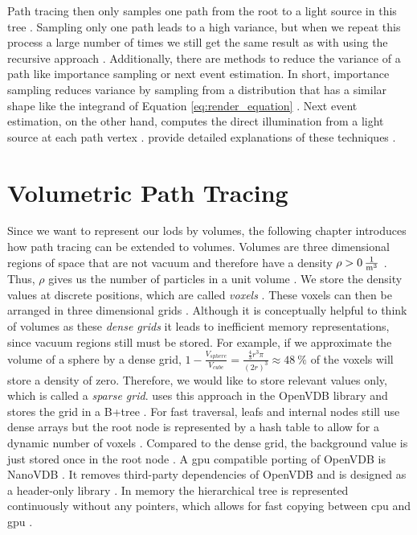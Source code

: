 Path tracing then only samples one path from the root to a light source in this tree \cite{rendering_equation}.
Sampling only one path leads to a high variance, but when we repeat this process a large number of times we still get the same result as with using the recursive approach \cite{pbr}.
Additionally, there are methods to reduce the variance of a path like importance sampling or next event estimation.
In short, importance sampling reduces variance by sampling from a distribution that has a similar shape like the integrand of Equation \ref{eq:render_equation} \cite{rendering_equation}.
Next event estimation, on the other hand, computes the direct illumination from a light source at each path vertex \cite{pbr}.
\citeauthor{pbr} provide detailed explanations of these techniques \cite{pbr}.

\section{Volumetric Path Tracing}
Since we want to represent our \acsp{lod} by volumes, the following chapter introduces how path tracing can be extended to volumes.
Volumes are three dimensional regions of space that are not vacuum and therefore have a density ${\rho > \SI{0}{\frac{1}{\m^3}}}$ \cite{pbr}.
Thus, $\rho$ gives us the number of particles in a unit volume \cite{novak_overview}.
We store the density values at discrete positions, which are called \textit{voxels} \cite{pbr}.
These voxels can then be arranged in three dimensional grids \cite{pbr}.
Although it is conceptually helpful to think of volumes as these \textit{dense grids} it leads to inefficient memory representations, since vacuum regions still must be stored.
For example, if we approximate the volume of a sphere by a dense grid, $1 - \frac{V_{sphere}}{V_{cube}} = \frac{\frac{4}{3}r^3\pi}{(2r)^3}\approx \SI{48}{\%}$ of the voxels will store a density of zero.
Therefore, we would like to store relevant values only, which is called a \textit{sparse grid}.
\citeauthor{museth_vdb} uses this approach in the OpenVDB library and stores the grid in a B+tree \cite{museth_vdb}.
For fast traversal, leafs and internal nodes still use dense arrays but the root node is represented by a hash table to allow for a dynamic number of voxels \cite{museth_vdb}.
Compared to the dense grid, the background value is just stored once in the root node \cite{museth_vdb}.
A \ac{gpu} compatible porting of OpenVDB is NanoVDB \cite{museth_nanovdb}.
It removes third-party dependencies of OpenVDB and is designed as a header-only library \cite{museth_nanovdb}.
In memory the hierarchical tree is represented continuously without any pointers, which allows for fast copying between \ac{cpu} and \ac{gpu} \cite{museth_nanovdb}.

